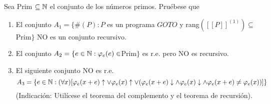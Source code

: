 \documentclass[11pt]{article}
\begin{document}
\begin{ejercicio}{2}
Sea Prim $\subseteq \mathbb{N}$ el conjunto de los números primos. Pruébese que
\begin{enumerate}
\item El conjunto $A_1 = \{\#(P) : P$ es un programa $GOTO$ y rang$([\![P]\!]^{(1)})\subseteq$Prim$\}$ NO es un conjunto recursivo.
\item El conjunto $A_2 = \{e \in \mathbb{N} : \varphi_e(e)\in$Prim$\}$ es r.e. pero NO es recursivo.
\item El siguiente conjunto NO es r.e.
$$A_3 = \{e \in \mathbb{N} : (\forall x) [\varphi_e(x + e)\uparrow\lor \varphi_e(x)\uparrow \lor(\varphi_e(x + e)\downarrow \land \varphi_e(x)\downarrow \land \varphi_e(x + e) \neq \varphi_e(x))]\}$$
(Indicación: Utilícese el teorema del complemento y el teorema de recursión).
\end{enumerate}
\end{ejercicio}
\end{document}
